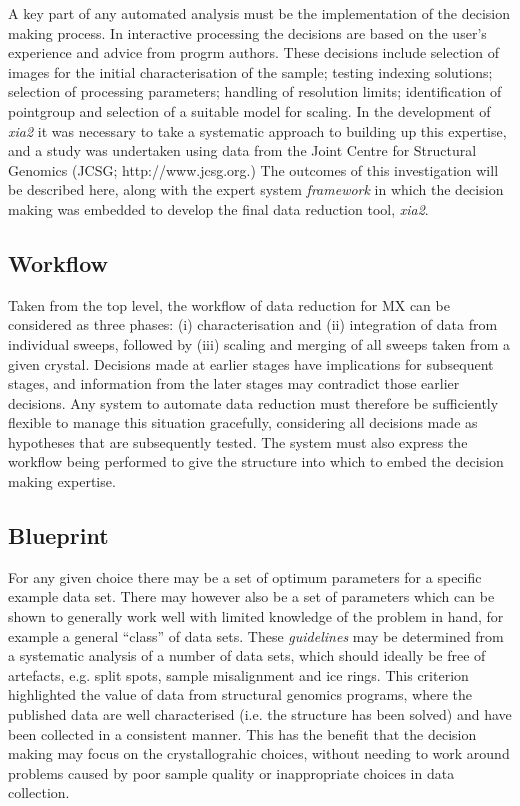 \documentclass[preprint,pdf]{iucr}
\begin{document}
A key part of any automated analysis must be the implementation of the
decision making process. In interactive processing the decisions are
based on the user's experience and advice from progrm authors. These
decisions include selection of images for the initial characterisation
of the sample; testing indexing solutions; selection of processing
parameters; handling of resolution limits; identification of pointgroup and
selection of a suitable model for scaling. In the development of
\emph{xia2} it was necessary to take a systematic approach to building
up this expertise, and a study was undertaken using data from the
Joint Centre
for Structural Genomics (JCSG; http://www.jcsg.org.) The
outcomes of this investigation will be described here, along with the
expert system \emph{framework} in which the decision making was
embedded to develop the final data reduction tool, \emph{xia2}.

\subsection{Workflow}

Taken from the top level, the workflow of data reduction for MX
can be considered as three phases:
(i) characterisation and (ii) integration of data from individual sweeps,
followed by (iii) scaling and merging of all sweeps taken from a given
crystal. Decisions made at earlier stages have implications for
subsequent stages, and information from the later stages may
contradict those earlier decisions. Any system to automate data
reduction must therefore be sufficiently flexible to manage this
situation gracefully, considering all decisions made as hypotheses
that are subsequently tested. The system must also express the workflow being
performed to give the structure into which to embed the decision
making expertise.

\subsection{Blueprint}

For any given choice there may be a set of optimum parameters for a
specific example data set. There may however also be a set of
parameters which can be 
shown to generally work well with limited knowledge of the problem in
hand, for example a general ``class'' of data sets.
These \emph{guidelines} may be determined from a systematic
analysis of a number of data sets, which should ideally be free of
artefacts, e.g. split spots, sample misalignment and ice rings. 
This criterion highlighted the value of data from 
structural genomics programs, where the published data are well
characterised (i.e. the structure has been solved) and have been
collected in a consistent manner. This has the benefit that the
decision making may focus on the crystallograhic choices, without
needing to work around problems caused by poor sample quality or
inappropriate choices in data collection. 
\end{document}
